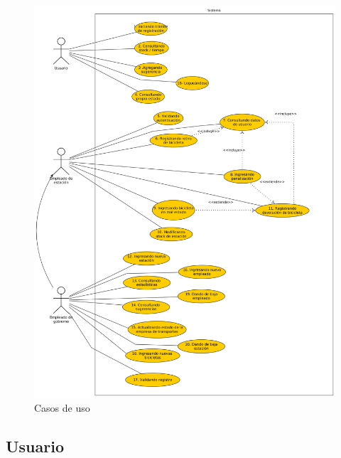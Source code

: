 \begin{figure}[H]
	\centering
	\includegraphics[scale=0.2]{imgs/casos_de_uso.png}
	\caption{Casos de uso}
\end{figure}

\subsection{Usuario}

~


